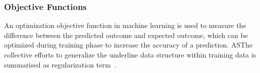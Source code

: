 \subsubsection{Objective Functions}
An optimization objective function in machine learning is used to measure the difference between the predicted outcome and expected outcome, which can be optimized during training phase to increase the accuracy of a prediction. ASThe collective efforts to generalize the underline data structure within training data is summarised as regularization term~\cite{goodfellow_2015}.  